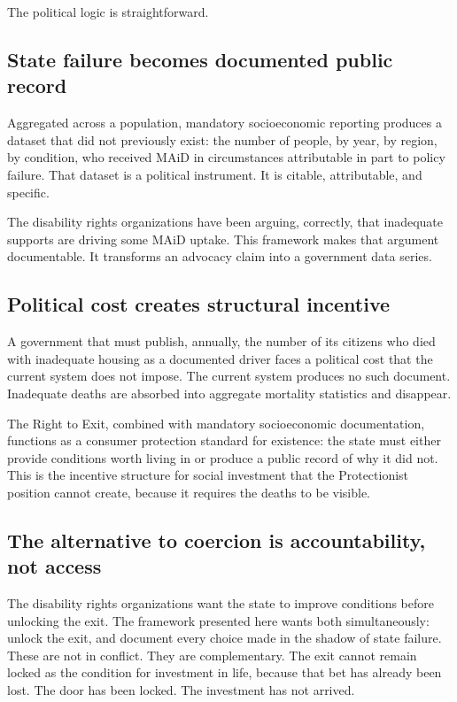\documentclass[11pt, letterpaper]{article}
\begin{document}
The political logic is straightforward.

\subsection{State failure becomes documented public record}

Aggregated across a population, mandatory socioeconomic reporting produces a dataset that
did not previously exist: the number of people, by year, by region, by condition, who
received MAiD in circumstances attributable in part to policy failure. That dataset is
a political instrument. It is citable, attributable, and specific.

The disability rights organizations have been arguing, correctly, that inadequate supports
are driving some MAiD uptake. This framework makes that argument documentable. It transforms
an advocacy claim into a government data series.

\subsection{Political cost creates structural incentive}

A government that must publish, annually, the number of its citizens who died with inadequate
housing as a documented driver faces a political cost that the current system does not
impose. The current system produces no such document. Inadequate deaths are absorbed into
aggregate mortality statistics and disappear.

The Right to Exit, combined with mandatory socioeconomic documentation, functions as a
consumer protection standard for existence: the state must either provide conditions worth
living in or produce a public record of why it did not. This is the incentive structure
for social investment that the Protectionist position cannot create, because it requires
the deaths to be visible.

\subsection{The alternative to coercion is accountability, not access}

The disability rights organizations want the state to improve conditions before unlocking
the exit. The framework presented here wants both simultaneously: unlock the exit, and
document every choice made in the shadow of state failure. These are not in conflict.
They are complementary. The exit cannot remain locked as the condition for investment
in life, because that bet has already been lost. The door has been locked. The investment
has not arrived.
\end{document}
